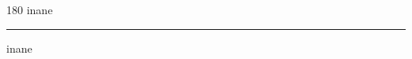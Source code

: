 
\begin{frame}
\begin{center}
\begin{turn}{180}
{\fontsize{2.5cm}{1em}\selectfont inane}
\end{turn}
\vspace{1em}\par  
\hrule
\vspace{1em}\par  
{\fontsize{2.5cm}{1em}\selectfont inane}
\end{center}
\end{frame}
